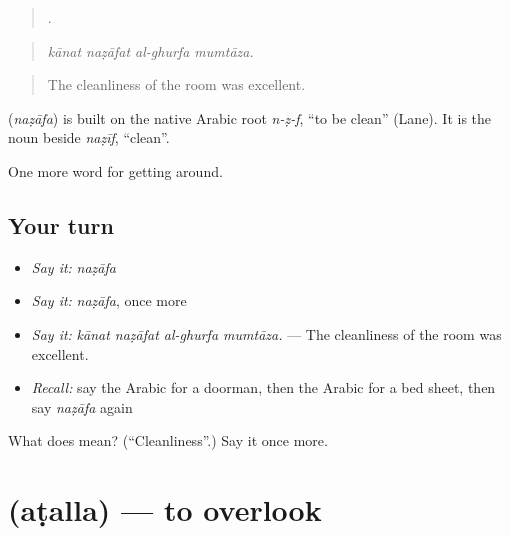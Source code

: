 \begin{quote}
   .
\end{quote}

\begin{quote}
\emph{kānat naẓāfat al-ghurfa mumtāza.}
\end{quote}

\begin{quote}
The cleanliness of the room was excellent.
\end{quote}

\begin{cousinweb}
\textbf{} (\emph{naẓāfa}) is built on the native Arabic root \emph{n-ẓ-f}, \textquotedblleft{}to be clean\textquotedblright{} (Lane). It is the noun beside \emph{naẓīf}, \textquotedblleft{}clean\textquotedblright{}.
\end{cousinweb}

\begin{grammarlens}[title={What you've built}]
One more word for getting around.
\end{grammarlens}

\subsection*{Your turn}
\begin{itemize}
\raggedright
  \item \emph{Say it:} \emph{naẓāfa}
  \item \emph{Say it:} \emph{naẓāfa}, once more
  \item \emph{Say it:} \emph{kānat naẓāfat al-ghurfa mumtāza.} — The cleanliness of the room was excellent.
  \item \emph{Recall:} say the Arabic for a doorman, then the Arabic for a bed sheet, then say \emph{naẓāfa} again
\end{itemize}

\begin{tcolorbox}[breakable,colback=teal!4,colframe=teal!35!black,title={Before you move on}]
What does  mean? (\textquotedblleft{}Cleanliness\textquotedblright{}.) Say it once more.
\end{tcolorbox}
\section[\texorpdfstring{\ar{أطل} (aṭalla)}{أطل (aṭalla)}]{ (aṭalla) — to overlook}

\label{lesson:AR-C443-atalla}




